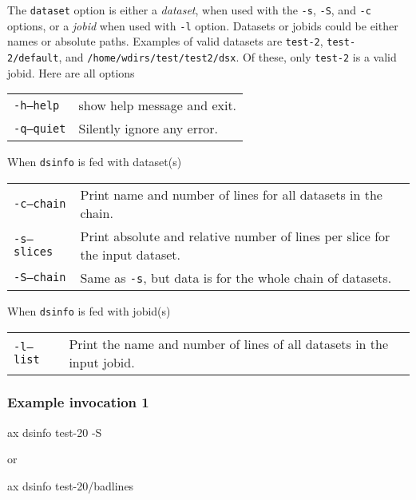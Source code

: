 The \texttt{dataset} option is either a \textsl{dataset}, when used
with the \texttt{-s}, \texttt{-S}, and \texttt{-c} options, or a
\textsl{jobid} when used with \texttt{-l} option.  Datasets or jobids
could be either names or absolute paths.  Examples of valid datasets
are \texttt{test-2}, \texttt{test-2/default}, and
\texttt{/home/wdirs/test/test2/dsx}.  Of these, only \texttt{test-2}
is a valid jobid.
Here are all options
\begin{snugshade}
\begin{tabular}{p{4cm}p{9cm}}
  \texttt{-h}\hspace{3cm}\texttt{---help} & show help message and exit.\\[4ex]
  \texttt{-q}\hspace{3cm}\texttt{---quiet} & Silently ignore any error.\\
\end{tabular}
\end{snugshade}
When \texttt{dsinfo} is fed with dataset(s)
\begin{snugshade}
\begin{tabular}{p{4cm}p{9cm}}
  \texttt{-c}\hspace{3cm}\texttt{---chain} & Print name and number of
  lines for all datasets in the chain.\\[4ex]
  \texttt{-s}\hspace{3cm}\texttt{---slices} & Print absolute and
  relative number of lines per slice for the input dataset.\\[2ex]
  \texttt{-S}\hspace{3cm}\texttt{---chain} & Same as \texttt{-s}, but
  data is for the whole chain of datasets.\\
\end{tabular}
\end{snugshade}
When \texttt{dsinfo} is fed with jobid(s)
\begin{snugshade}
\begin{tabular}{p{4cm}p{9cm}}
  \texttt{-l}\hspace{3cm}\texttt{---list} & Print the name and number
  of lines of all datasets in the input jobid.\\
\end{tabular}
\end{snugshade}

\subsubsection*{Example invocation 1}
\begin{shell}
ax dsinfo test-20 -S
\end{shell}
or
\begin{shell}
ax dsinfo test-20/badlines
\end{shell}

